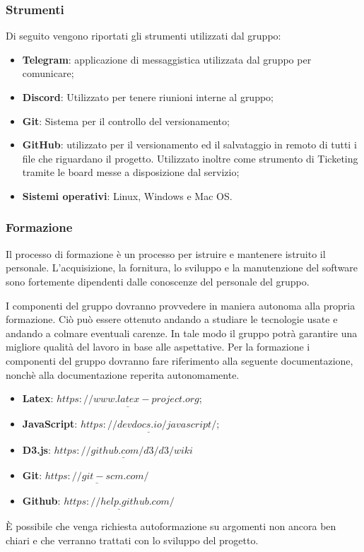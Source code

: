 		\subsubsection{Strumenti}
		Di seguito vengono riportati gli strumenti utilizzati dal gruppo:
		\begin{itemize}
			\item \textbf{Telegram}: applicazione di messaggistica utilizzata dal gruppo per comunicare;
			\item \textbf{Discord}: Utilizzato per tenere riunioni interne al gruppo;
			\item \textbf{Git}: Sistema per il controllo del versionamento;
			\item \textbf{GitHub}: utilizzato per il versionamento ed il salvataggio in remoto di tutti i file che riguardano il progetto. Utilizzato inoltre come strumento di Ticketing tramite le board messe a disposizione dal servizio;
			\item \textbf{Sistemi operativi}: Linux, Windows e Mac OS.
		\end{itemize}
		
		
		\subsubsection{Formazione}
		Il processo di formazione è un processo per istruire e mantenere istruito il personale. L'acquisizione, la fornitura, lo sviluppo e la manutenzione del software sono fortemente dipendenti dalle conoscenze del personale del gruppo.
		
		
		I componenti del gruppo dovranno provvedere in maniera autonoma alla propria formazione. Ciò può essere ottenuto andando a studiare le tecnologie usate e andando a colmare eventuali carenze. In tale modo il gruppo potrà garantire una migliore qualità del lavoro in base alle aspettative. Per la formazione i componenti del gruppo dovranno fare riferimento alla seguente documentazione, nonchè alla documentazione reperita autonomamente.
		\begin{itemize}
			\item \textbf{Latex}: $\underline{https://www.latex-project.org}$;
			\item \textbf{JavaScript}: $\underline{https://devdocs.io/javascript/}$;
			\item \textbf{D3.js}: $\underline{https://github.com/d3/d3/wiki}$
			\item \textbf{Git}: $\underline{https://git-scm.com/}$
			\item \textbf{Github}: $\underline{https://help.github.com/}$			
		\end{itemize}
		È possibile che venga richiesta autoformazione su argomenti non ancora ben chiari e che verranno trattati con lo sviluppo del progetto.	
		
